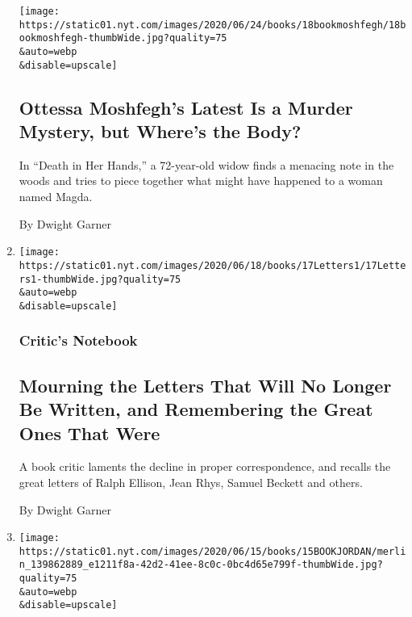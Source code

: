 \begin{enumerate}
  \texttt{[image: https://static01.nyt.com/images/2020/06/24/books/18bookmoshfegh/18bookmoshfegh-thumbWide.jpg?quality=75\\\&auto=webp\\\&disable=upscale]}

  \hypertarget{ottessa-moshfeghs-latest-is-a-murder-mystery-but-wheres-the-body}{%
  \subsection{Ottessa Moshfegh's Latest Is a Murder Mystery, but Where's
  the
  Body?}\label{ottessa-moshfeghs-latest-is-a-murder-mystery-but-wheres-the-body}}

  In ``Death in Her Hands,'' a 72-year-old widow finds a menacing note
  in the woods and tries to piece together what might have happened to a
  woman named Magda.

  By Dwight Garner
\item
  \href{/2020/06/17/books/art-of-writing-letters.html}{}

  \texttt{[image: https://static01.nyt.com/images/2020/06/18/books/17Letters1/17Letters1-thumbWide.jpg?quality=75\\\&auto=webp\\\&disable=upscale]}

  \hypertarget{critics-notebook}{%
  \subsubsection{Critic's Notebook}\label{critics-notebook}}

  \hypertarget{mourning-the-letters-that-will-no-longer-be-written-and-remembering-the-great-ones-that-were}{%
  \subsection{Mourning the Letters That Will No Longer Be Written, and
  Remembering the Great Ones That
  Were}\label{mourning-the-letters-that-will-no-longer-be-written-and-remembering-the-great-ones-that-were}}

  A book critic laments the decline in proper correspondence, and
  recalls the great letters of Ralph Ellison, Jean Rhys, Samuel Beckett
  and others.

  By Dwight Garner
\item
  \href{/2020/06/14/books/review-art-of-her-deal-melania-trump-mary-jordan.html}{}

  \texttt{[image: https://static01.nyt.com/images/2020/06/15/books/15BOOKJORDAN/merlin\_139862889\_e1211f8a-42d2-41ee-8c0c-0bc4d65e799f-thumbWide.jpg?quality=75\\\&auto=webp\\\&disable=upscale]}


\end{enumerate}
